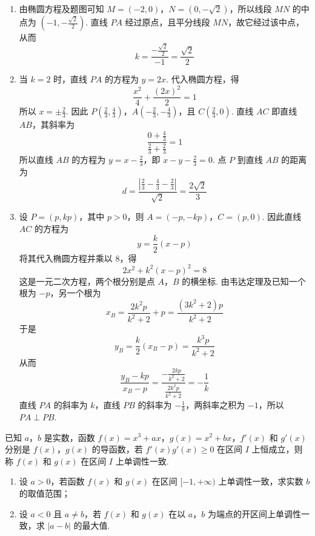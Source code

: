 \begin{solution}
\begin{enumerate}
\item 由椭圆方程及题图可知 \(M=(-2,0)\)，\(N=(0,-\sqrt{2})\)，所以线段 \(MN\) 的中点为
\(\left(-1,-\frac{\sqrt{2}}{2}\right)\). 直线 \(PA\) 经过原点，且平分线段 \(MN\)，故它经过该中点，从而
\[
k=\frac{-\frac{\sqrt{2}}{2}}{-1}=\frac{\sqrt{2}}{2}
\]

\item 当 \(k=2\) 时，直线 \(PA\) 的方程为 \(y=2x\). 代入椭圆方程，得
\[
\frac{x^2}{4}+\frac{(2x)^2}{2}=1
\]
所以 \(x=\pm\frac{2}{3}\).
因此 \(P\left(\frac{2}{3},\frac{4}{3}\right)\)，\(A\left(-\frac{2}{3},-\frac{4}{3}\right)\)，且 \(C\left(\frac{2}{3},0\right)\). 直线 \(AC\) 即直线 \(AB\)，其斜率为
\[
\frac{0+\frac{4}{3}}{\frac{2}{3}+\frac{2}{3}}=1
\]
所以直线 \(AB\) 的方程为 \(y=x-\frac{2}{3}\)，即 \(x-y-\frac{2}{3}=0\). 点 \(P\) 到直线 \(AB\) 的距离为
\[
d=\frac{\left|\frac{2}{3}-\frac{4}{3}-\frac{2}{3}\right|}{\sqrt{2}}=\frac{2\sqrt{2}}{3}
\]

\item 设 \(P=(p,kp)\)，其中 \(p>0\)，则 \(A=(-p,-kp)\)，\(C=(p,0)\). 因此直线 \(AC\) 的方程为
\[
y=\frac{k}{2}(x-p)
\]
将其代入椭圆方程并乘以 \(8\)，得
\[
2x^2+k^2(x-p)^2=8
\]
这是一元二次方程，两个根分别是点 \(A\)，\(B\) 的横坐标. 由韦达定理及已知一个根为 \(-p\)，另一个根为
\[
x_B=\frac{2k^2p}{k^2+2}+p=\frac{(3k^2+2)p}{k^2+2}
\]
于是
\[
y_B=\frac{k}{2}(x_B-p)=\frac{k^3p}{k^2+2}
\]
从而
\[
\frac{y_B-kp}{x_B-p}=\frac{-\frac{2kp}{k^2+2}}{\frac{2k^2p}{k^2+2}}=-\frac{1}{k}
\]
直线 \(PA\) 的斜率为 \(k\)，直线 \(PB\) 的斜率为 \(-\frac{1}{k}\)，两斜率之积为 \(-1\)，所以 \(PA\perp PB\).
\end{enumerate}
\end{solution}

\begin{problem}
已知 \(a\)，\(b\) 是实数，函数 \(f(x)=x^3+ax\)，\(g(x)=x^2+bx\)，\(f'(x)\) 和 \(g'(x)\) 分别是 \(f(x)\)，\(g(x)\) 的导函数，若 \(f'(x)g'(x)\geqslant 0\) 在区间 \(I\) 上恒成立，则称 \(f(x)\) 和 \(g(x)\) 在区间 \(I\) 上单调性一致.

\begin{enumerate}
\item 设 \(a>0\)，若函数 \(f(x)\) 和 \(g(x)\) 在区间 \([-1,+\infty)\) 上单调性一致，求实数 \(b\) 的取值范围；
\item 设 \(a<0\) 且 \(a\neq b\)，若 \(f(x)\) 和 \(g(x)\) 在以 \(a\)，\(b\) 为端点的开区间上单调性一致，求 \(|a-b|\) 的最大值.
\end{enumerate}
\end{problem}

